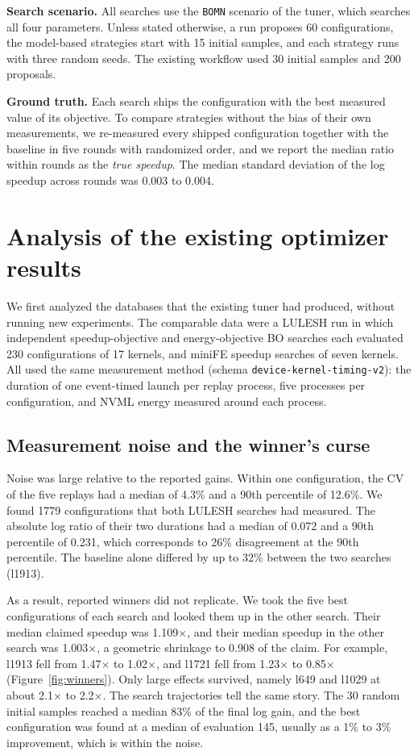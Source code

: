 \documentclass[10pt]{article}
\newcommand{\x}{\ensuremath{\times}}
\newcommand{\code}[1]{\texttt{#1}}
\begin{document}
\textbf{Search scenario.} All searches use the \code{BOMN} scenario of the
tuner, which searches all four parameters. Unless stated otherwise, a run
proposes 60 configurations, the model-based strategies start with 15
initial samples, and each strategy runs with three random seeds. The
existing workflow used 30 initial samples and 200 proposals.

\textbf{Ground truth.} Each search ships the configuration with the best
measured value of its objective. To compare strategies without the bias of
their own measurements, we re-measured every shipped configuration together
with the baseline in five rounds with randomized order, and we report the
median ratio within rounds as the \emph{true speedup}. The median standard
deviation of the log speedup across rounds was 0.003 to 0.004.

\section{Analysis of the existing optimizer results}
\label{sec:offline}

We first analyzed the databases that the existing tuner had produced, without
running new experiments. The comparable data were a LULESH run in which
independent speedup-objective and energy-objective BO searches each evaluated
230 configurations of 17 kernels, and miniFE speedup searches of seven
kernels. All used the same measurement method (schema
\code{device-kernel-timing-v2}): the duration of one event-timed launch per
replay process, five processes per configuration, and NVML energy measured
around each process.

\subsection{Measurement noise and the winner's curse}
Noise was large relative to the reported gains. Within one configuration, the
CV of the five replays had a median of 4.3\% and a 90th percentile of
12.6\%. We found 1779 configurations that both LULESH searches had measured.
The absolute log ratio of their two durations had a median of 0.072 and a
90th percentile of 0.231, which corresponds to 26\% disagreement at the 90th
percentile. The baseline alone differed by up to 32\% between the two
searches (l1913).

As a result, reported winners did not replicate. We took the five best
configurations of each search and looked them up in the other search. Their
median claimed speedup was 1.109\x{}, and their median speedup in the other
search was 1.003\x{}, a geometric shrinkage to 0.908 of the claim. For
example, l1913 fell from 1.47\x{} to 1.02\x{}, and l1721 fell from 1.23\x{}
to 0.85\x{} (Figure~\ref{fig:winners}). Only large effects survived, namely
l649 and l1029 at about 2.1\x{} to 2.2\x{}. The search trajectories tell the same story. The 30
random initial samples reached a median 83\% of the final log gain, and the
best configuration was found at a median of evaluation 145, usually as a 1\%
to 3\% improvement, which is within the noise.
\end{document}
